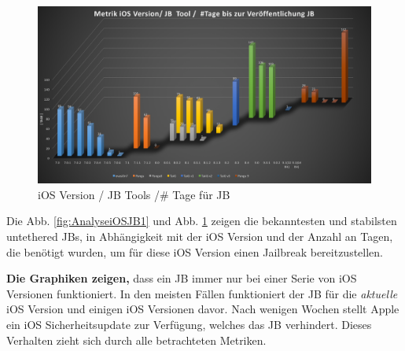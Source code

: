 \begin{figure}[hp!]
        \centering
                \includegraphics[scale=0.35]{Bilder/Frage1_2.png}
        \caption{iOS Version / JB Tools /\# Tage für JB \protect\footnotemark}
        \label{fig:AnalyseiOSJB2}
\end{figure}

Die Abb. \ref{fig:AnalyseiOSJB1} und Abb. \ref{fig:AnalyseiOSJB2} zeigen die bekanntesten und stabilsten untethered JBs, in Abhängigkeit mit der iOS Version und der Anzahl an Tagen, die benötigt wurden, um für diese iOS Version einen Jailbreak bereitzustellen. \par 
\textbf{Die Graphiken zeigen,} dass ein JB immer nur bei einer Serie von iOS Versionen funktioniert. In den meisten Fällen funktioniert der JB für die \textit{\glqq aktuelle\grqq{}} iOS Version und einigen iOS Versionen davor. Nach wenigen Wochen stellt Apple ein iOS Sicherheitsupdate zur Verfügung, welches das JB verhindert. Dieses Verhalten zieht sich durch alle betrachteten Metriken.  
%

